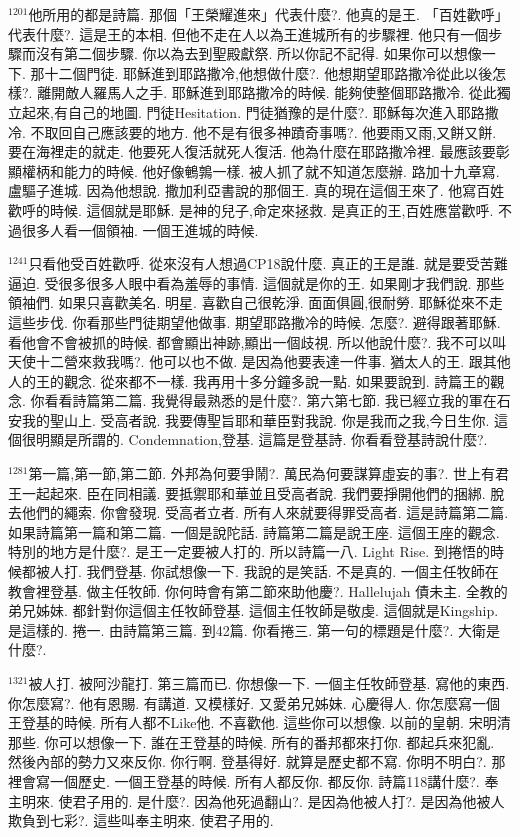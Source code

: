\documentclass{book}
\begin{document}
$^{1201}$他所用的都是詩篇.
那個「王榮耀進來」代表什麼?.
他真的是王.
「百姓歡呼」代表什麼?.
這是王的本相.
但他不走在人以為王進城所有的步驟裡.
他只有一個步驟而沒有第二個步驟.
你以為去到聖殿獻祭.
所以你記不記得.
如果你可以想像一下.
那十二個門徒.
耶穌進到耶路撒冷,他想做什麼?.
他想期望耶路撒冷從此以後怎樣?.
離開敵人羅馬人之手.
耶穌進到耶路撒冷的時候.
能夠使整個耶路撒冷.
從此獨立起來,有自己的地圖.
門徒Hesitation.
門徒猶豫的是什麼?.
耶穌每次進入耶路撒冷.
不取回自己應該要的地方.
他不是有很多神蹟奇事嗎?.
他要雨又雨,又餅又餅.
要在海裡走的就走.
他要死人復活就死人復活.
他為什麼在耶路撒冷裡.
最應該要彰顯權柄和能力的時候.
他好像鵪鶉一樣.
被人抓了就不知道怎麼辦.
路加十九章寫.
盧驅子進城.
因為他想說.
撒加利亞書說的那個王.
真的現在這個王來了.
他寫百姓歡呼的時候.
這個就是耶穌.
是神的兒子,命定來拯救.
是真正的王,百姓應當歡呼.
不過很多人看一個領袖.
一個王進城的時候.

$^{1241}$只看他受百姓歡呼.
從來沒有人想過CP18說什麼.
真正的王是誰.
就是要受苦難逼迫.
受很多很多人眼中看為羞辱的事情.
這個就是你的王.
如果剛才我們說.
那些領袖們.
如果只喜歡美名.
明星.
喜歡自己很乾淨.
面面俱圓,很耐勞.
耶穌從來不走這些步伐.
你看那些門徒期望他做事.
期望耶路撒冷的時候.
怎麼?.
避得跟著耶穌.
看他會不會被抓的時候.
都會顯出神跡,顯出一個歧視.
所以他說什麼?.
我不可以叫天使十二營來救我嗎?.
他可以也不做.
是因為他要表達一件事.
猶太人的王.
跟其他人的王的觀念.
從來都不一樣.
我再用十多分鐘多說一點.
如果要說到.
詩篇王的觀念.
你看看詩篇第二篇.
我覺得最熟悉的是什麼?.
第六第七節.
我已經立我的軍在石安我的聖山上.
受高者說.
我要傳聖旨耶和華臣對我說.
你是我而之我,今日生你.
這個很明顯是所謂的.
Condemnation,登基.
這篇是登基詩.
你看看登基詩說什麼?.

$^{1281}$第一篇,第一節,第二節.
外邦為何要爭鬧?.
萬民為何要謀算虛妄的事?.
世上有君王一起起來.
臣在同相議.
要抵禦耶和華並且受高者說.
我們要掙開他們的捆綁.
脫去他們的繩索.
你會發現.
受高者立者.
所有人來就要得罪受高者.
這是詩篇第二篇.
如果詩篇第一篇和第二篇.
一個是說陀話.
詩篇第二篇是說王座.
這個王座的觀念.
特別的地方是什麼?.
是王一定要被人打的.
所以詩篇一八.
Light Rise.
到捲悟的時候都被人打.
我們登基.
你試想像一下.
我說的是笑話.
不是真的.
一個主任牧師在教會裡登基.
做主任牧師.
你何時會有第二節來助他慶?.
Hallelujah 債未主.
全教的弟兄姊妹.
都針對你這個主任牧師登基.
這個主任牧師是敬虔.
這個就是Kingship.
是這樣的.
捲一.
由詩篇第三篇.
到42篇.
你看捲三.
第一句的標題是什麼?.
大衛是什麼?.

$^{1321}$被人打.
被阿沙龍打.
第三篇而已.
你想像一下.
一個主任牧師登基.
寫他的東西.
你怎麼寫?.
他有恩賜.
有講道.
又模樣好.
又愛弟兄姊妹.
心慶得人.
你怎麼寫一個王登基的時候.
所有人都不Like他.
不喜歡他.
這些你可以想像.
以前的皇朝.
宋明清那些.
你可以想像一下.
誰在王登基的時候.
所有的番邦都來打你.
都起兵來犯亂.
然後內部的勢力又來反你.
你行啊.
登基得好.
就算是歷史都不寫.
你明不明白?.
那裡會寫一個歷史.
一個王登基的時候.
所有人都反你.
都反你.
詩篇118講什麼?.
奉主明來.
使君子用的.
是什麼?.
因為他死過翻山?.
是因為他被人打?.
是因為他被人欺負到七彩?.
這些叫奉主明來.
使君子用的.
\end{document}
